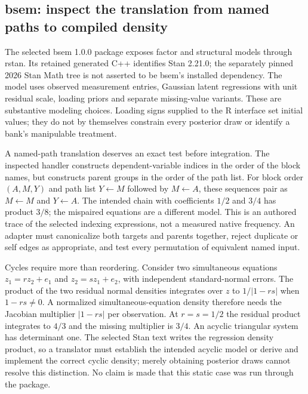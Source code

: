 \subsection{bsem: inspect the translation from named paths to compiled density}

The selected bsem 1.0.0 package exposes factor and structural models through
rstan. Its retained generated C++ identifies Stan 2.21.0; the separately pinned
2026 Stan Math tree is not asserted to be bsem's installed dependency. The
model uses observed measurement entries, Gaussian latent regressions with unit
residual scale, loading priors and separate missing-value variants. These are
substantive modeling choices. Loading signs supplied to the R interface set
initial values; they do not by themselves constrain every posterior draw or
identify a bank's manipulable treatment.\citep{exec25_cmed_bsem}

A named-path translation deserves an exact test before integration. The inspected
handler constructs dependent-variable indices in the order of the block names,
but constructs parent groups in the order of the path list. For block order
$(A,M,Y)$ and path list $Y\leftarrow M$ followed by $M\leftarrow A$, these
sequences pair as $M\leftarrow M$ and $Y\leftarrow A$. The intended chain with
coefficients $1/2$ and $3/4$ has product $3/8$; the mispaired equations are a
different model. This is an authored trace of the selected indexing expressions,
not a measured native frequency. An adapter must canonicalize both targets and
parents together, reject duplicate or self edges as appropriate, and test every
permutation of equivalent named input.\citep{exec25_cmed_bsem,exec25_cmed_choice}

Cycles require more than reordering. Consider two simultaneous equations
$z_1=r z_2+e_1$ and $z_2=s z_1+e_2$, with independent standard-normal errors.
The product of the two residual normal densities integrates over $z$ to
$1/|1-rs|$ when $1-rs\ne0$. A normalized simultaneous-equation density therefore
needs the Jacobian multiplier $|1-rs|$ per observation. At $r=s=1/2$ the
residual product integrates to $4/3$ and the missing multiplier is $3/4$.
An acyclic triangular system has determinant one. The selected Stan text writes
the regression density product, so a translator must establish the intended
acyclic model or derive and implement the correct cyclic density; merely
obtaining posterior draws cannot resolve this distinction. No claim is made
that this static case was run through the package.\citep{exec25_cmed_bsem,exec25_cmed_choice}

